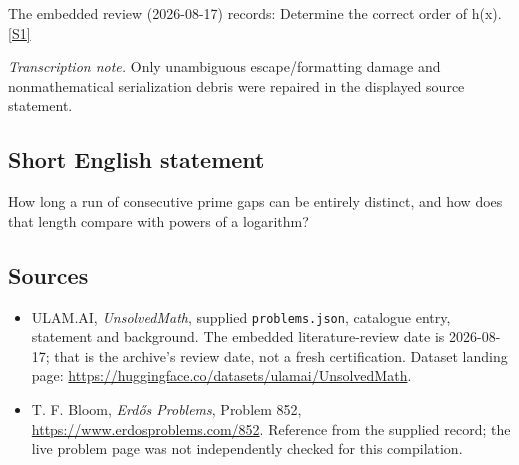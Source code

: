 \documentclass[11pt,a4paper]{article}
\newcommand{\sref}[2]{\hyperlink{source:#1:#2}{[S#2]}}
\begin{document}
The embedded review (2026-08-17) records: Determine the correct order of h(x). \sref{statement}{1}

{\small\emph{Transcription note.} Only unambiguous escape/formatting damage and nonmathematical serialization debris were repaired in the displayed source statement.}

\subsection{Short English statement}

How long a run of consecutive prime gaps can be entirely distinct, and how does that length compare with powers of a logarithm?

\subsection{Sources}

{\small

\begin{itemize}

\item[\hypertarget{source:statement:1}{S1}] ULAM.AI, \emph{UnsolvedMath}, supplied \texttt{problems.json}, catalogue entry, statement and background. The embedded literature-review date is 2026-08-17; that is the archive’s review date, not a fresh certification. Dataset landing page: \url{https://huggingface.co/datasets/ulamai/UnsolvedMath}.

\item[\hypertarget{source:statement:2}{S2}] T. F. Bloom, \emph{Erdős Problems}, Problem 852, \url{https://www.erdosproblems.com/852}. Reference from the supplied record; the live problem page was not independently checked for this compilation.

\end{itemize}

}

\label{end:statement}
\end{document}
